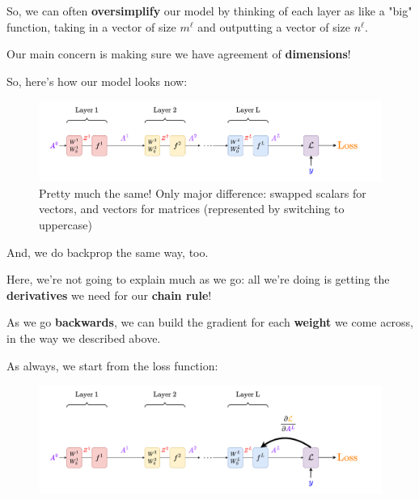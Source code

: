         So, we can often \textbf{oversimplify} our model by thinking of each layer as like a "big" function, taking in a vector of size $m^\ell$ and outputting a vector of size $n^\ell$. 
        
        Our main concern is making sure we have agreement of \textbf{dimensions}!
    
        So, here's how our model looks now:
        
        \begin{figure}[H]
            \centering
            \includegraphics[width=180mm,scale=0.4]{images/nn_1_5_images/network_bp_full.png}
            \caption*{Pretty much the same! Only major difference: swapped scalars for vectors, and vectors for matrices (represented by switching to uppercase)}
        \end{figure}
        
        And, we do backprop the same way, too.
        
        Here, we're not going to explain much as we go: all we're doing is getting the \textbf{derivatives} we need for our \textbf{chain rule}! 
        
        As we go \textbf{backwards}, we can build the gradient for each \textbf{weight} we come across, in the way we described above.
        
        As always, we start from the loss function:
        
        \begin{figure}[H]
            \centering
            \includegraphics[width=180mm,scale=0.4]{images/nn_1_5_images/network_bp_full1.png}
        \end{figure}
        
